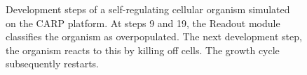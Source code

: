 \begin{figure}[!ht]
  \quad
  \quad
  \quad
  \quad
  \quad
  \quad
  \caption{
    Development steps of a self-regulating cellular organism simulated on
    the CARP platform. At steps 9 and 19, the Readout module classifies the
    organism as overpopulated. The next development step, the organism reacts to
    this by killing off cells. The growth cycle subsequently restarts.
    \label{fig:example-development}
  }
\end{figure}
\cleardoublepage